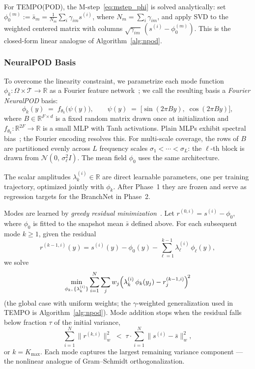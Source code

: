 \documentclass[preprint,10pt]{elsarticle}
\begin{document}
For TEMPO(POD), the M-step~\eqref{eq:mstep_phi} is solved analytically:
set $\phi_0^{(m)} := \bar{s}_m = \frac{1}{N_m}\sum_i \gamma_{im} s^{(i)}$,
where $N_m = \sum_i \gamma_{im}$, and apply SVD to
the weighted centered matrix with columns
$\sqrt{\gamma_{im}}\,(s^{(i)}-\phi_0^{(m)})$.
This is the closed-form linear analogue of Algorithm~\ref{alg:npod}.

\subsubsection{NeuralPOD Basis}\label{sec:neuralpod_basis}

To overcome the linearity constraint, we parametrize each mode
function $\phi_k : \Omega{\times}\mathcal{T} \to \mathbb{R}$ as a
Fourier feature network~\cite{Tancik2020}; we call the resulting basis a \emph{Fourier NeuralPOD} basis:
\begin{equation}
  \phi_k(y) \;=\; f_{\theta_k}\!\bigl(\psi(y)\bigr),
  \qquad
  \psi(y) \;=\;
  \bigl[\sin(2\pi By),\;\cos(2\pi By)\bigr],
  \label{eq:ffn}
\end{equation}
where $B \in \mathbb{R}^{F \times d}$ is a fixed random matrix drawn
once at initialization and $f_{\theta_k} : \mathbb{R}^{2F} \to \mathbb{R}$
is a small MLP with Tanh activations.
Plain MLPs exhibit spectral bias~\cite{Rahaman2019}; the Fourier encoding
resolves this.
For multi-scale coverage, the rows of $B$ are partitioned evenly across
$L$ frequency scales $\sigma_1 < \cdots < \sigma_L$: the $\ell$-th block is drawn from
$\mathcal{N}(0,\,\sigma_\ell^2 I)$.
The mean field $\phi_0$ uses the same architecture.

The scalar amplitudes $\lambda_k^{(i)} \in \mathbb{R}$ are direct
learnable parameters, one per training trajectory, optimized jointly
with $\phi_k$.
After Phase~1 they are frozen and serve as regression targets for the
BranchNet in Phase~2.

Modes are learned by \emph{greedy residual minimization}~\cite{Mou2026}.
Let $r^{(0,i)} = s^{(i)} - \phi_0$, where $\phi_0$ is fitted to the snapshot mean $\bar{s}$ defined above.
For each subsequent mode $k \ge 1$, given the residual
\begin{equation}
  r^{(k-1,i)}(y)
  = s^{(i)}(y)
  - \phi_0(y)
  - \sum_{\ell=1}^{k-1}\lambda_\ell^{(i)}\,\phi_\ell(y),
  \label{eq:residual_global}
\end{equation}
we solve
\begin{equation}
  \min_{\phi_k,\,\{\lambda_k^{(i)}\}}
  \sum_{i=1}^{N} \sum_j w_j
  \Bigl(\lambda_k^{(i)}\,\phi_k(y_j) - r_j^{(k-1,i)}\Bigr)^{\!2}
  \label{eq:neuralpod_loss}
\end{equation}
(the global case with uniform weights; the $\gamma$-weighted
generalization used in TEMPO is Algorithm~\ref{alg:npod}).
Mode addition stops when the residual falls below fraction $\tau$ of
the initial variance,
\begin{equation}
  \sum_{i=1}^N \|r^{(k,i)}\|_w^2
  \;<\;
  \tau \cdot \sum_{i=1}^N \|s^{(i)} - \bar{s}\|_w^2,
  \label{eq:npod_tol}
\end{equation}
or $k = K_{\max}$.
Each mode captures the largest remaining variance component — the nonlinear analogue of Gram--Schmidt orthogonalization.
\end{document}

